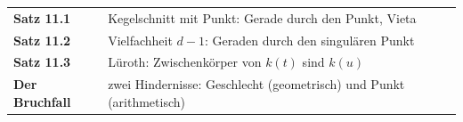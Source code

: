 \begin{merksatz}
\begin{center}
\renewcommand{\arraystretch}{1.5}
\begin{tabular}{@{}P{3.0cm}P{5.6cm}@{}}
\toprule
\textbf{Satz 11.1} & Kegelschnitt mit Punkt: Gerade durch den Punkt, Vieta\\
\textbf{Satz 11.2} & Vielfachheit $d - 1$: Geraden durch den singulären Punkt\\
\textbf{Satz 11.3} & Lüroth: Zwischenkörper von $k(t)$ sind $k(u)$\\
\textbf{Der Bruchfall} & zwei Hindernisse: Geschlecht (geometrisch) und Punkt (arithmetisch)\\
\bottomrule
\end{tabular}
\end{center}

\begin{center}
\begin{minipage}{0.88\textwidth}
\end{minipage}
\end{center}
\end{merksatz}
